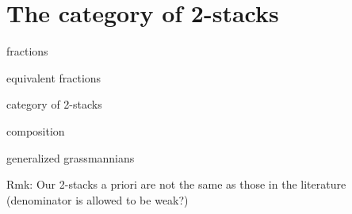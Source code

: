 %
%

\section{The category of 2-stacks}

\noi fractions

\bigskip

\noi equivalent fractions

\bigskip

\noi category of 2-stacks

\bigskip

\noi composition

\bigskip

\noi generalized grassmannians

\bigskip

\noi Rmk: Our 2-stacks a priori are not the same as those in the literature (denominator is allowed to be weak?)














